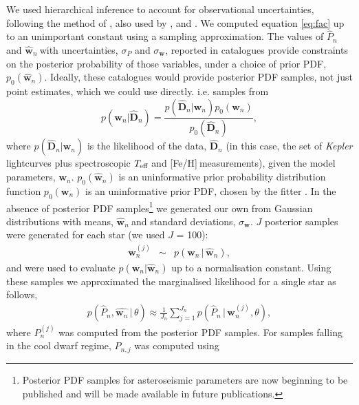\documentclass[11pt,preprint]{aastex}
\newcommand{\logg}{log \emph{g}}
\newcommand{\teff}{$T_{\rm{eff}}$}
\newcommand{\w}{\mathbf{w}}
\newcommand{\wh}{$\hat{\mathbf{w}}_n$}
\newcommand{\ph}{$\hat{P}_n$}
\newcommand{\feh}{[Fe/H]}
\begin{document}
We used hierarchical inference to account for observational uncertainties,
following the method of \citet{Hogg2010}, also used by
\citet{Foreman-Mackey2014}, \citet{Rogers2014} and \citet{Morton2014}.
We computed equation \ref{eq:fac} up to an unimportant constant
using a sampling approximation.
The values of \ph$~$and \wh$~$with uncertainties, $\sigma_P$ and
$\sigma_{\mathbf{w}}$, reported in catalogues provide constraints on the
posterior probability of those variables, under a choice of prior PDF,
$p_0(\hat{\mathbf{w}}_n)$.
Ideally, these catalogues would provide posterior PDF samples, not just point
estimates, which we could use directly.
i.e. samples from
\begin{equation}
	p(\mathbf{w}_n|\hat{\mathbf{D}}_n) =
	\frac{p(\hat{\mathbf{D}}_n|\mathbf{w}_n)p_0(\mathbf{w}_n)}
	{p_0(\hat{\mathbf{D}}_n)},
\end{equation}
where $p(\hat{\mathbf{D}}_n|\w_n)$ is the likelihood of the data,
$\hat{\mathbf{D}}_n$ (in this case,
the set of {\it Kepler} lightcurves plus spectroscopic \teff$~$and
\feh$~$measurements), given the model parameters, $\mathbf{w}_n$.
$p_0(\hat{\w}_n)$ is an uninformative prior probability distribution
function $p_0(\mathbf{w}_n)$ is an uninformative prior PDF, chosen by the
fitter \citep[][used a flat prior PDF in age and \logg]{Chaplin2014}.
In the absence of posterior PDF samples\footnote{Posterior PDF samples
for asteroseismic parameters are now beginning to be published and will be made
available in future publications.} we generated our own from Gaussian
distributions with means, \wh$~$and standard deviations, $\sigma_{\mathbf{w}}$.
$J$ posterior samples were generated for each star (we used $J$ = 100):
\begin{eqnarray}
\w_n^{(j)} &\sim& p(\w_n\,|\,\hat{\w}_n),
\end{eqnarray}
and were used to evaluate $p(\mathbf{w}_n|\hat{\mathbf{w}}_n)$ up to a
normalisation constant.
Using these samples we approximated the marginalised likelihood for a single
star as follows,
\begin{align}
	p(\hat{P}_n,\hat{\w_n}\,|\,\theta) \approx \frac{1}{J_n}
	\sum_{j=1}^{J_n}p(\hat{P}_n\,|\,\mathbf{w}_n^{(j)},\theta),
\end{align}
where $P_n^{(j)}$ was computed from the posterior PDF samples.
For samples falling in the cool dwarf regime, $P_{n,j}$ was computed using
\end{document}
